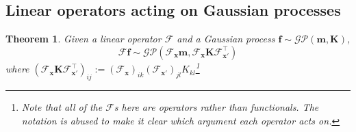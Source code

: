 \documentclass[12pt,a4paper,twoside]{report}
\newtheorem{thm}{Theorem}[section]
\theoremstyle{definition}
\newcommand{\f}{\mathscr F_\mathbf x}
\begin{document}
\subsection{Linear operators acting on Gaussian processes}

\begin{thm}\label{lineargp}
	Given a linear operator $\mathscr F$ and a Gaussian process $\mathbf f\sim \mathcal{GP}(\mathbf m,\mathbf  K)$,
	$$\mathscr F \mathbf f \sim \mathcal{GP}(\f \mathbf m, \f \mathbf K \mathscr{F}_{\mathbf x'}^\top)$$
	where $(\f \mathbf K \mathscr{F}_{\mathbf x'}^\top)_{ij}:=(\f)_{ik}(\mathscr{F}_{\mathbf x'})_{jl} K_{kl}$\footnote{Note that all of the $\mathscr F$s here are operators rather than functionals. The notation is abused to make it clear which argument each operator acts on.}
\end{thm}
\end{document}
